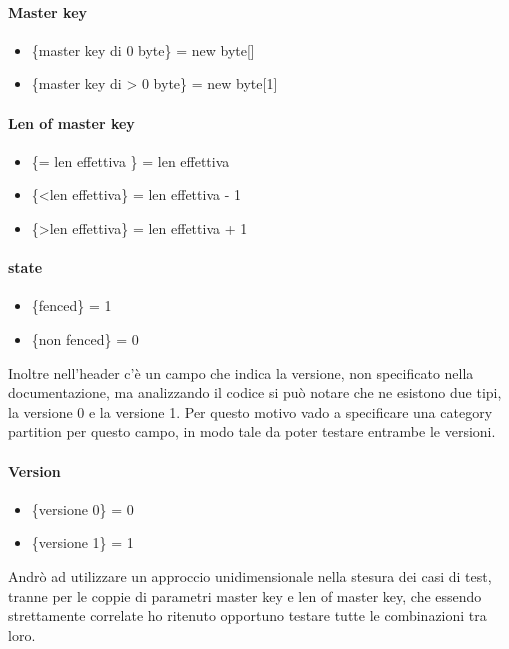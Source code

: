 \documentclass[12pt, a4paper]{article}
\begin{document}
\paragraph{Master key}
\begin{itemize}
  \item \{master key di 0 byte\} = new byte[]
  \item \{master key di > 0 byte\} = new byte[1]
\end{itemize}

\paragraph{Len of master key}
\begin{itemize}
  \item \{= len effettiva \} = len effettiva
  \item \{\textless len effettiva\} = len effettiva - 1
  \item \{\textgreater len effettiva\} = len effettiva + 1
\end{itemize}

\paragraph{state}
\begin{itemize}
  \item \{fenced\} = 1
  \item \{non fenced\} = 0
\end{itemize}

Inoltre nell'header c'è un campo che indica la versione, non specificato nella documentazione, ma
analizzando il codice si può notare che ne esistono due tipi, la versione 0 e la versione 1. Per questo motivo
vado a specificare una category partition per questo campo, in modo tale da poter testare entrambe le versioni.

\paragraph{Version}
\begin{itemize}
  \item \{versione 0\} = 0
  \item \{versione 1\} = 1
\end{itemize}

Andrò ad utilizzare un approccio unidimensionale nella stesura dei casi 
di test, tranne per le coppie di parametri master key e len of master key,
che essendo strettamente correlate ho ritenuto opportuno testare tutte le 
combinazioni tra loro.
\end{document}
